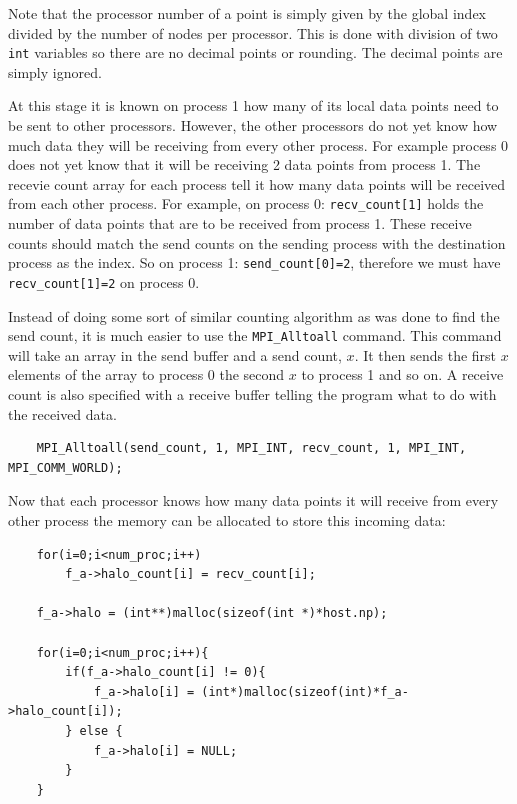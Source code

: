 \documentclass[pdftex,12pt,a4paper]{article}
\begin{document}
Note that the processor number of a point is simply given by the global index divided by the number of nodes per processor. This is done with division of two \verb|int| variables so there are no decimal points or rounding. The decimal points are simply ignored.

At this stage it is known on process 1 how many of its local data points need to be sent to other processors. However, the other processors do not yet know how much data they will be receiving from every other process. For example process 0 does not yet know that it will be receiving 2 data points from process 1. The recevie count array for each process tell it how many data points will be received from each other process. For example, on process 0: \verb|recv_count[1]| holds the number of data points that are to be received from process 1. These receive counts should match the send counts on the sending process with the destination process as the index. So on process 1: \verb|send_count[0]=2|, therefore we must have \verb|recv_count[1]=2| on process 0.

Instead of doing some sort of similar counting algorithm as was done to find the send count, it is much easier to use the \verb|MPI_Alltoall| command. This command will take an array in the send buffer and a send count, $x$. It then sends the first $x$ elements of the array to process 0 the second $x$ to process 1 and so on. A receive count is also specified with a receive buffer telling the program what to do with the received data.

\begin{lstlisting}
	MPI_Alltoall(send_count, 1, MPI_INT, recv_count, 1, MPI_INT, MPI_COMM_WORLD);
\end{lstlisting}

Now that each processor knows how many data points it will receive from every other process the memory can be allocated to store this incoming data:

\begin{lstlisting}
	for(i=0;i<num_proc;i++)
		f_a->halo_count[i] = recv_count[i];

	f_a->halo = (int**)malloc(sizeof(int *)*host.np);

	for(i=0;i<num_proc;i++){
		if(f_a->halo_count[i] != 0){
			f_a->halo[i] = (int*)malloc(sizeof(int)*f_a->halo_count[i]);
		} else {
			f_a->halo[i] = NULL;
		}
	}
\end{lstlisting}


\end{document}
